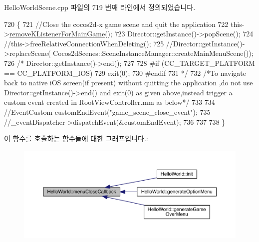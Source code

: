 Hello\+World\+Scene.\+cpp 파일의 719 번째 라인에서 정의되었습니다.


\begin{DoxyCode}
720 \{
721     \textcolor{comment}{//Close the cocos2d-x game scene and quit the application}
722     this->\hyperlink{class_hello_world_aa4aaf4a6d2ae2e0cb07273d0ee004861}{removeKListenerForMainGame}();
723     Director::getInstance()->popScene();
724     \textcolor{comment}{//this->freeRelativeConnectionWhenDeleting();}
725     \textcolor{comment}{//Director::getInstance()->replaceScene( Cocos2dScenes::SceneInstanceManager::createMainMenuScene());}
726    \textcolor{comment}{/* Director::getInstance()->end();}
727 \textcolor{comment}{}
728 \textcolor{comment}{    #if (CC\_TARGET\_PLATFORM == CC\_PLATFORM\_IOS)}
729 \textcolor{comment}{    exit(0);}
730 \textcolor{comment}{    #endif}
731 \textcolor{comment}{    */}
732     \textcolor{comment}{/*To navigate back to native iOS screen(if present) without quitting the application  ,do not use
       Director::getInstance()->end() and exit(0) as given above,instead trigger a custom event created in
       RootViewController.mm as below*/}
733     
734     \textcolor{comment}{//EventCustom customEndEvent("game\_scene\_close\_event");}
735     \textcolor{comment}{//\_eventDispatcher->dispatchEvent(&customEndEvent);}
736     
737     
738 \}
\end{DoxyCode}
이 함수를 호출하는 함수들에 대한 그래프입니다.\+:
\nopagebreak
\begin{figure}[H]
\begin{center}
\leavevmode
\includegraphics[width=350pt]{d9/d98/class_hello_world_ac4ab2f5e922e659d4f137591c0f6a9b0_icgraph}
\end{center}
\end{figure}
\mbox{\label{class_hello_world_a1609fd202ff4b899571aeb34b3cdaed4}} 
